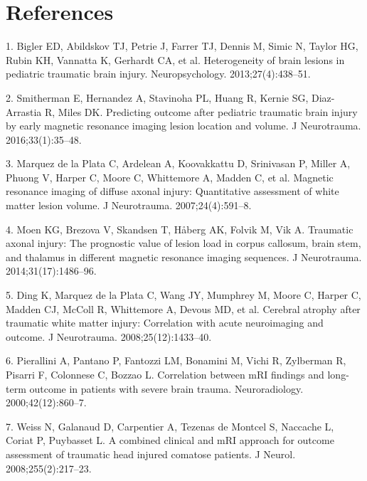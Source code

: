 \documentclass[11pt,]{article}
\begin{document}
\clearpage

\section*{References}\label{references}

\hypertarget{refs}{}
\hypertarget{ref-Bigler:2013aa}{}
1. Bigler ED, Abildskov TJ, Petrie J, Farrer TJ, Dennis M, Simic N,
Taylor HG, Rubin KH, Vannatta K, Gerhardt CA, et al. Heterogeneity of
brain lesions in pediatric traumatic brain injury. Neuropsychology.
2013;27(4):438--51.

\hypertarget{ref-Smitherman:2016aa}{}
2. Smitherman E, Hernandez A, Stavinoha PL, Huang R, Kernie SG,
Diaz-Arrastia R, Miles DK. Predicting outcome after pediatric traumatic
brain injury by early magnetic resonance imaging lesion location and
volume. J Neurotrauma. 2016;33(1):35--48.

\hypertarget{ref-Marquez-de-la-Plata:2007aa}{}
3. Marquez de la Plata C, Ardelean A, Koovakkattu D, Srinivasan P,
Miller A, Phuong V, Harper C, Moore C, Whittemore A, Madden C, et al.
Magnetic resonance imaging of diffuse axonal injury: Quantitative
assessment of white matter lesion volume. J Neurotrauma.
2007;24(4):591--8.

\hypertarget{ref-Moen:2014aa}{}
4. Moen KG, Brezova V, Skandsen T, Håberg AK, Folvik M, Vik A. Traumatic
axonal injury: The prognostic value of lesion load in corpus callosum,
brain stem, and thalamus in different magnetic resonance imaging
sequences. J Neurotrauma. 2014;31(17):1486--96.

\hypertarget{ref-Ding:2008aa}{}
5. Ding K, Marquez de la Plata C, Wang JY, Mumphrey M, Moore C, Harper
C, Madden CJ, McColl R, Whittemore A, Devous MD, et al. Cerebral atrophy
after traumatic white matter injury: Correlation with acute neuroimaging
and outcome. J Neurotrauma. 2008;25(12):1433--40.

\hypertarget{ref-Pierallini:2000aa}{}
6. Pierallini A, Pantano P, Fantozzi LM, Bonamini M, Vichi R, Zylberman
R, Pisarri F, Colonnese C, Bozzao L. Correlation between mRI findings
and long-term outcome in patients with severe brain trauma.
Neuroradiology. 2000;42(12):860--7.

\hypertarget{ref-Weiss:2008aa}{}
7. Weiss N, Galanaud D, Carpentier A, Tezenas de Montcel S, Naccache L,
Coriat P, Puybasset L. A combined clinical and mRI approach for outcome
assessment of traumatic head injured comatose patients. J Neurol.
2008;255(2):217--23.
\end{document}
